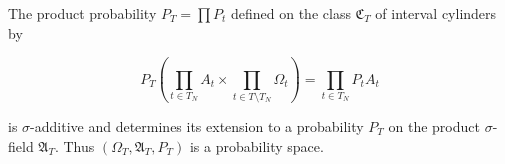 The product probability $P_T = \prod P_t$ defined on the class $\mathfrak{C}_T$ of interval cylinders by

$$P_T\left(\prod_{t \in T_N} A_t \times \prod_{t \in T \setminus T_N} \Omega_t\right) = \prod_{t \in T_N} P_t A_t$$

is $\sigma$-additive and determines its extension to a probability $P_T$ on the product $\sigma$-field $\mathfrak{A}_T$. Thus $(\Omega_T, \mathfrak{A}_T, P_T)$ is a probability space.
